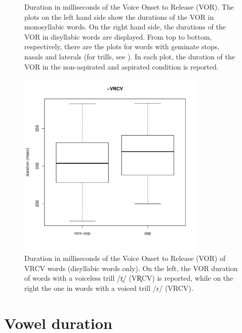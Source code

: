 \documentclass[11pt,a4paper,openany]{memoir}\usepackage[]{graphicx}\usepackage[]{color}
\newenvironment{knitrout}{}{} %
\begin{document}
\begin{figure}
\begin{subfigure}{.5\textwidth}
\begin{knitrout}
\end{knitrout}
\end{subfigure}
\caption[Duration in milliseconds of the Voice Onset to Release (VOR).]{\footnotesize Duration in milliseconds of the Voice Onset to Release (VOR).
The plots on the left hand side show the durations of the VOR in monosyllabic words.
On the right hand side, the durations of the VOR in disyllabic words are displayed.
From top to bottom, respectively, there are the plots for words with geminate stops, nasals and laterals (for trills, see ).
In each plot, the duration of the VOR in the non-aspirated and aspirated condition is reported.
}
\label{f:vor}
\end{figure}

\begin{figure}
\centering
\begin{knitrout}
\color{fgcolor}
\includegraphics[width=0.8\textwidth]{img/di-rho-vor-1} 

\end{knitrout}
\caption[Duration in milliseconds of the Voice Onset to Release (VOR) of VRCV words.]{Duration in milliseconds of the Voice Onset to Release (VOR) of VRCV words (disyllabic words only).
On the left, the VOR duration of words with a voiceless trill /r̥/ (VR̥CV) is reported, while on the right the one in words with a voiced trill /r/ (VRCV).}
\label{f:vor-rho}
\end{figure}


\section{Vowel duration}
\label{s:vow-dur}
\end{document}
